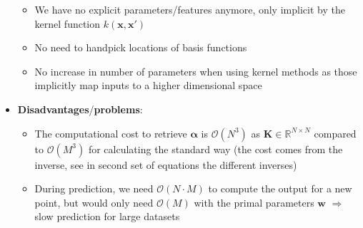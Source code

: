 \begin{itemize}
\begin{itemize}
		\item We have no explicit parameters/features anymore, only implicit by the kernel function $k(\bm{x},\bm{x}')$
		\item No need to handpick locations of basis functions 
		\item No increase in number of parameters when using kernel methods as those implicitly map inputs to a higher dimensional space
	\end{itemize}
	\item \textbf{Disadvantages}/\textbf{problems}:
	\begin{itemize}
		\item The computational cost to retrieve $\bm{\alpha}$ is $\mathcal{O}(N^3)$ as $\bm{K}\in\mathbb{R}^{N\times N}$ compared to $\mathcal{O}(M^3)$ for calculating the standard way (the cost comes from the inverse, see in second set of equations the different inverses)
		\item During prediction, we need $\mathcal{O}(N\cdot M)$ to compute the output for a new point, but would only need $\mathcal{O}(M)$ with the primal parameters $\bm{w}$ $\Rightarrow$ slow prediction for large datasets
	\end{itemize}
\end{itemize}
